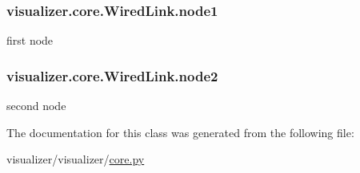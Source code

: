\subsubsection[{\texorpdfstring{node1}{node1}}]{\setlength{\rightskip}{0pt plus 5cm}visualizer.\+core.\+Wired\+Link.\+node1}\hypertarget{classvisualizer_1_1core_1_1WiredLink_a60b0a98057fa7c53c67e74ab92facfb1}{}\label{classvisualizer_1_1core_1_1WiredLink_a60b0a98057fa7c53c67e74ab92facfb1}


first node 

\subsubsection[{\texorpdfstring{node2}{node2}}]{\setlength{\rightskip}{0pt plus 5cm}visualizer.\+core.\+Wired\+Link.\+node2}\hypertarget{classvisualizer_1_1core_1_1WiredLink_abf9a99a21be943f7cea2c6516eb3d789}{}\label{classvisualizer_1_1core_1_1WiredLink_abf9a99a21be943f7cea2c6516eb3d789}


second node 



The documentation for this class was generated from the following file\+:\begin{DoxyCompactItemize}
\item 
visualizer/visualizer/\hyperlink{visualizer_2visualizer_2core_8py}{core.\+py}\end{DoxyCompactItemize}
